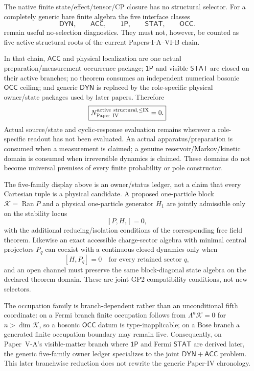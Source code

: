 \documentclass[12pt,a4paper]{article}
\begin{document}
\begin{remark}
\label{p4:rem:paper4-selector-count}
The native finite state/effect/tensor/CP closure has no structural selector.
For a completely generic bare finite algebra the five interface classes
\[
 \boxed{\mathsf{DYN},\qquad\mathsf{ACC},\qquad
 \mathsf{1P},\qquad\mathsf{STAT},\qquad\mathsf{OCC}.}
\]
remain useful no-selection diagnostics.  They must not, however, be counted as
five active structural roots of the current Papers-I-A--VI-B chain.

In that chain, \(\mathsf{ACC}\) and physical localization are one actual
preparation/measurement occurrence package; \(\mathsf{1P}\) and visible
\(\mathsf{STAT}\) are closed on their active branches; no theorem consumes an
independent numerical bosonic \(\mathsf{OCC}\) ceiling; and generic
\(\mathsf{DYN}\) is replaced by the role-specific physical owner/state
packages used by later papers.  Therefore
\[
 \boxed{N_{\rm Paper\ IV}^{\rm active\ structural,\le IX}=0.}
\]
Actual source/state and cyclic-response evaluation remains wherever a
role-specific readout has not been evaluated. An actual apparatus/preparation
is consumed when a measurement is claimed; a genuine reservoir/Markov/kinetic
domain is consumed when irreversible dynamics is claimed. These domains do
not become universal premises of every finite probability or pole constructor.
\end{remark}


\begin{remark}
\label{p4:rem:joint-manybody-compatibility}
The five-family display above is an owner/status ledger, not a claim that every
Cartesian tuple is a physical candidate.  A proposed one-particle block
\(\mathcal K=\operatorname{Ran}P\) and a physical one-particle generator
\(H_1\) are jointly admissible only on the stability locus
\[
 \boxed{[P,H_1]=0},
\]
with the additional reducing/isolation conditions of the corresponding free
field theorem.  Likewise an exact accessible charge-sector algebra with
minimal central projectors \(P_q\) can coexist with a continuous closed
dynamics only when
\[
 \boxed{[H,P_q]=0\quad\text{for every retained sector }q},
\]
and an open channel must preserve the same block-diagonal state algebra on the
declared theorem domain.  These are joint GP2 compatibility conditions, not
new selectors.

The occupation family is branch-dependent rather than an unconditional fifth
coordinate: on a Fermi branch finite occupation follows from
\(\Lambda^n\mathcal K=0\) for \(n>\dim\mathcal K\), so a bosonic
\(\mathsf{OCC}\) datum is type-inapplicable; on a Bose branch a generated
finite occupation boundary may remain live.  Consequently, on Paper~V-A's
visible-matter branch where \(\mathsf{1P}\) and Fermi \(\mathsf{STAT}\) are
derived later, the generic five-family owner ledger specializes to the joint
\(\mathsf{DYN}+\mathsf{ACC}\) problem.  This later branchwise reduction does
not rewrite the generic Paper-IV chronology.
\end{remark}
\end{document}
